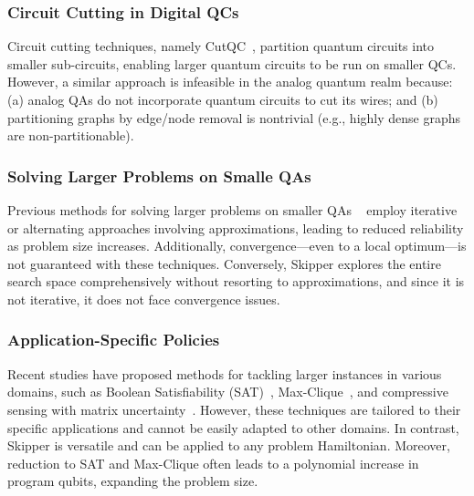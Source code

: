 \subsubsection{Circuit Cutting in Digital QCs}

Circuit cutting techniques, namely CutQC~\cite{tang2021cutqc}, partition quantum circuits into smaller sub-circuits, enabling larger quantum circuits to be run on smaller QCs. 
However, a similar approach is infeasible in the analog quantum realm because:
(a) analog QAs do not incorporate quantum circuits to cut its wires; 
and (b) partitioning graphs by edge/node removal is nontrivial (e.g., highly dense graphs are non-partitionable).


\subsubsection{Solving Larger Problems on Smalle QAs}

Previous methods for solving larger problems on smaller QAs ~\cite{pelofske2022solving, okada2019improving} employ iterative or alternating approaches involving approximations, leading to reduced reliability as problem size increases. 
Additionally, convergence---even to a local optimum---is not guaranteed with these techniques.
Conversely, Skipper explores the entire search space comprehensively without resorting to approximations, and since it is not iterative, it does not face convergence issues.


\newpage
\subsubsection{Application-Specific Policies}

Recent studies have proposed methods for tackling larger instances in various domains, such as Boolean Satisfiability (SAT)~\cite{tan2023hyqsat}, Max-Clique~\cite{pelofske2023solving, pelofske2019solving, pelofske2022parallel,pelofske2021decomposition}, and compressive sensing with matrix uncertainty~\cite{ayanzadeh2019quantum,mousavi2019survey}. 
However, these techniques are tailored to their specific applications and cannot be easily adapted to other domains. 
In contrast, Skipper is versatile and can  be applied to any problem Hamiltonian. 
Moreover, reduction to SAT and Max-Clique often leads to a polynomial increase in program qubits, expanding the problem size.

